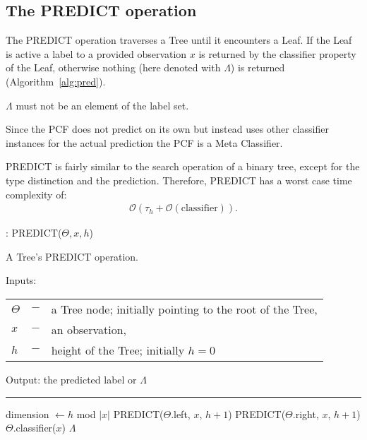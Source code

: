 \subsection{The PREDICT operation}

The PREDICT operation traverses a Tree until it encounters
a Leaf. If the Leaf is active a label to a provided
observation $x$ is returned by the classifier
property of the Leaf, otherwise nothing (here denoted with
$\Lambda$) is returned (Algorithm~\ref{alg:pred}).

$\Lambda$ must not be an element of the label set.

Since the PCF does not predict on its own but instead uses
other classifier instances for the actual prediction the
PCF is a Meta Classifier.\cite[chapter 4.6]{pymvpa}

PREDICT is fairly similar to the search operation of a
binary tree, except for the type distinction and the
prediction.\cite[chapter 12.2]{Cormen} Therefore, PREDICT
has a worst case time complexity of:
\begin{align}
  \mathcal{O}(\tau_h + \mathcal{O}(\text{classifier})).
\end{align}

\begin{algorithm}
  \caption{: PREDICT($\Theta, x, h$)}%
  \label{alg:pred}
  A Tree's PREDICT operation.

  Inputs:

    \begin{tabu}{llX}
    $\Theta$ &$-$ &a Tree node; initially pointing to the
      root of the Tree,\\
    $x$ &$-$ &an observation,\\
    $h$ &$-$ &height of the Tree; initially $h = 0$
    \end{tabu}

  Output: the predicted label or $\Lambda$

  \noindent\rule{\linewidth}{0.4pt}

  \begin{algorithmic}[1]
      \STATE dimension $\leftarrow h$ mod $|x|$
        \STATE PREDICT($\Theta$.left, $x$, $h + 1$)
      \ELSE
        \STATE PREDICT($\Theta$.right, $x$, $h + 1$)
      \ENDIF
      \RETURN $\Theta$.classifier($x$)
    \ELSE
      \RETURN $\Lambda$
    \ENDIF
  \end{algorithmic}
\end{algorithm}
